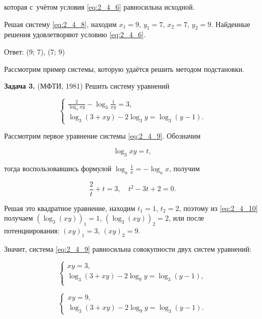 \noindent
которая с~учётом условия \eqref{eq:2_4_6} равносильна исходной.

Решая систему \eqref{eq:2_4_8}, находим $x_{1} = 9$, $y_{1} = 7$,
$x_{2} = 7$, $y_{2} = 9$.
Найденные решения удовлетворяют условию \eqref{eq:2_4_6}.

Ответ: (9; 7), (7; 9) 

Рассмотрим пример системы, которую удаётся решить методом подстановки.

\textbf{Задача 3.}\label{ex:2_4_3} (МФТИ, 1981) Решить систему уравнений

\begin{equation}\label{eq:2_4_9}
\begin{cases}
\displaystyle \frac{2}{\log_{3} xy} - \log_{3} \frac{1}{xy} = 3, \\
\log_{3} (3 + xy) - 2 \log_{3} y = \log_{3} (y - 1).
\end{cases}
\end{equation}

Рассмотрим первое уравнение системы \eqref{eq:2_4_9}.
Обозначим

\begin{equation}\label{eq:2_4_10}
\log_{3} xy = t,
\end{equation}

\noindent
тогда воспользовавшись формулой $\displaystyle \log_{a} \frac{1}{x} = -\log_{a} x$,
получим

\begin{equation*}
\displaystyle \frac{2}{t} + t = 3, \quad t^{2} - 3t + 2 = 0.
\end{equation*}

\noindent
Решая это квадратное уравнение, находим $t_{1} = 1$, $t_{2} = 2$,
поэтому из \eqref{eq:2_4_10} получаем
$\left( \log_{3} (xy) \right)_{1} = 1$,
$\left( \log_{3} (xy) \right)_{2} = 2$,
или после потенциирования: $(xy)_{1} = 3$, $(xy)_{2} = 9$.

Значит, система \eqref{eq:2_4_9} равносильна совокупности двух систем уравнений:

\begin{equation}\label{eq:2_4_11}
\begin{cases}
xy = 3, \\
\log_{3} (3 + xy) - 2 \log_{9} y = \log_{3} (y - 1), \\
\end{cases}
\end{equation}

\begin{equation}\label{eq:2_4_12}
\begin{cases}
xy = 9, \\
\log_{3} (3 + xy) - 2 \log_{9} y = \log_{3} (y - 1).
\end{cases}
\end{equation}

